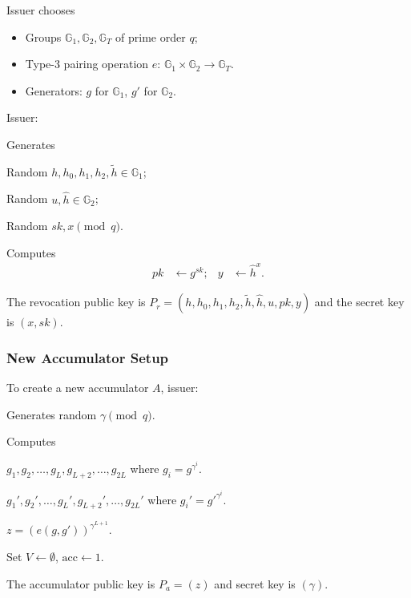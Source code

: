 Issuer chooses
\begin{itemize}
    \item Groups $\mathbb{G}_1,\mathbb{G}_2,\mathbb{G}_T$ of
    prime order $q$;
    \item Type-3 pairing operation $e:\, \mathbb{G}_1\times\mathbb{G}_2\rightarrow\mathbb{G}_T$.
    \item Generators: $g$ for $\mathbb{G}_1$, $g'$ for
    $\mathbb{G}_2$.
\end{itemize}

Issuer:
\begin{legal}
    \item Generates
    \begin{legal}
        \item Random $h,h_0,h_1,h_2,\widetilde{h}\in \mathbb{G}_1$;
        \item Random $u,\widehat{h}\in \mathbb{G}_2$;
        \item Random $sk,x \pmod{q}$.
    \end{legal}
    \item Computes 
\begin{align*}
    pk&\leftarrow g^{sk}; & y&\leftarrow \widehat{h}^x.
\end{align*}
\end{legal}

The revocation public key is
$P_r = (h,h_0,h_1,h_2,\widetilde{h},\widehat{h},u,pk,y)$ and the secret key is $(x,sk)$.
\subsubsection{New Accumulator Setup}
To create a new accumulator $A$, issuer:
\begin{legal}
\item Generates random $\gamma\pmod{q}$.
\item Computes
\begin{legal}
    \item $g_1,g_2,\ldots,g_L,g_{L+2},\ldots,g_{2L}$ where
$g_i = g^{\gamma^i}$. 
    \item $g_1',g_2',\ldots,g_L',g_{L+2}',\ldots,g_{2L}'$ where
$g_i' = g'^{\gamma^i}$. 
    \item $z = (e(g,g'))^{\gamma^{L+1}}$.
\end{legal}
\item Set $V \leftarrow\emptyset$, $\mathrm{acc}\leftarrow 1$.
\end{legal}
The accumulator public key is $P_a = (z)$ and secret key is $(\gamma)$.

